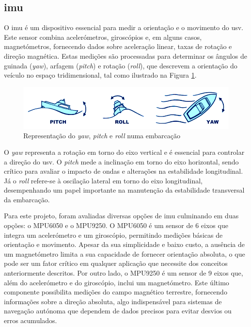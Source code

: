 \subsection{\acrfull{imu}} \label{subsec:imu}

O \gls{imu} é um dispositivo essencial para medir a orientação e o movimento do \gls{usv}. Este sensor combina acelerómetros, giroscópios e, em alguns casos, magnetómetros, fornecendo dados sobre aceleração linear, taxas de rotação e direção magnética. Estas medições são processadas para determinar os ângulos de guinada (\emph{yaw}), arfagem (\emph{pitch}) e rotação (\emph{roll}), que descrevem a orientação do veículo no espaço tridimensional, tal como ilustrado na Figura \ref{fig:pitch-roll-yaw}.

\begin{figure}[H]
    \centering
    \includegraphics[height=0.2\linewidth]{figuras/Pitch-Roll-Yaw.png}
    \caption[Representação do \emph{yaw}, \emph{pitch} e \emph{roll} numa embarcação]{Representação do \emph{yaw}, \emph{pitch} e \emph{roll} numa embarcação \cite{imagem-yaw-pitch-roll}}
    \label{fig:pitch-roll-yaw}
\end{figure}

O \emph{yaw} representa a rotação em torno do eixo vertical e é essencial para controlar a direção do \gls{usv}. O \emph{pitch} mede a inclinação em torno do eixo horizontal, sendo crítico para avaliar o impacto de ondas e alterações na estabilidade longitudinal. Já o \emph{roll} refere-se à oscilação lateral em torno do eixo longitudinal, desempenhando um papel importante na manutenção da estabilidade transversal da embarcação.

Para este projeto, foram avaliadas diversas opções de \gls{imu} culminando em duas opções: o MPU6050 e o MPU9250. O MPU6050 é um sensor de 6 eixos que integra um acelerómetro e um giroscópio, permitindo medições básicas de orientação e movimento. Apesar da sua simplicidade e baixo custo, a ausência de um magnetómetro limita a sua capacidade de fornecer orientação absoluta, o que pode ser um fator crítico em qualquer aplicação que necessite dos conceitos anteriormente descritos. Por outro lado, o MPU9250 é um sensor de 9 eixos que, além do acelerómetro e do giroscópio, inclui um magnetómetro. Este último componente possibilita medições do campo magnético terrestre, fornecendo informações sobre a direção absoluta, algo indispensável para sistemas de navegação autónoma que dependem de dados precisos para evitar desvios ou erros acumulados.

